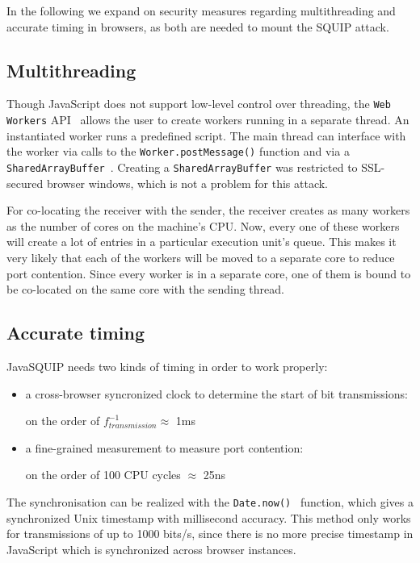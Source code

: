 \documentclass[11pt,
  titlepage=false,
]{scrreprt}
\begin{document}
In the following we expand on security measures regarding multithreading and accurate timing in browsers, as both are needed to mount the SQUIP attack.

\subsection{Multithreading}\label{subsec:multithreading}
Though JavaScript does not support low-level control over threading, the \texttt{Web Workers} API~\cite{webworkers} allows the user to create workers running in a separate thread.
An instantiated worker runs a predefined script.
The main thread can interface with the worker via calls to the \texttt{Worker.postMessage()} function and via a \texttt{SharedArrayBuffer}~\cite{sharedarraybuffer}.
Creating a \texttt{SharedArrayBuffer} was restricted to SSL-secured browser windows, which is not a problem for this attack.

For co-locating the receiver with the sender, the receiver creates as many workers as the number of cores on the machine's CPU.
Now, every one of these workers will create a lot of entries in a particular execution unit's queue.
This makes it very likely that each of the workers will be moved to a separate core to reduce port contention.
Since every worker is in a separate core, one of them is bound to be co-located on the same core with the sending thread.

\subsection{Accurate timing}\label{subsec:accurate-timing}
JavaSQUIP needs two kinds of timing in order to work properly:
\begin{itemize}
    \item a cross-browser syncronized clock to determine the start of bit transmissions:

    on the order of $f_{transmission}^{-1} \approx$ 1ms
    \item a fine-grained measurement to measure port contention:

    on the order of 100 CPU cycles $\approx$ 25ns
\end{itemize}

The synchronisation can be realized with the \texttt{Date.now()}~\cite{datenow} function, which gives a synchronized Unix timestamp with millisecond accuracy.
This method only works for transmissions of up to 1000 bits/s, since there is no more precise timestamp in JavaScript which is synchronized across browser instances.
\end{document}
